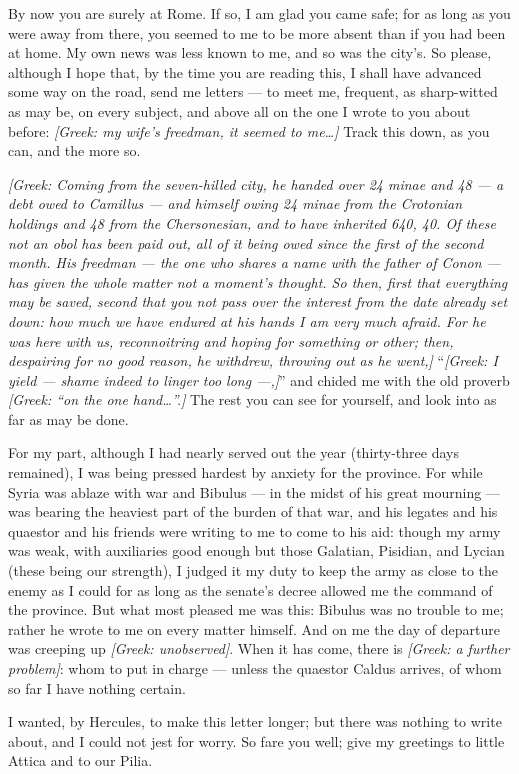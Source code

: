 

 By now you are surely at Rome. If so, I am glad you came safe; for as long as you were away from there, you seemed to me to be more absent than if you had been at home. My own news was less known to me, and so was the city's. So please, although I hope that, by the time you are reading this, I shall have advanced some way on the road, send me letters --- to meet me, frequent, as sharp-witted as may be, on every subject, and above all on the one I wrote to you about before: \textit{[Greek: my wife's freedman, it seemed to me\ldots]} Track this down, as you can, and the more so.

 \textit{[Greek: Coming from the seven-hilled city, he handed over 24 minae and 48 --- a debt owed to Camillus --- and himself owing 24 minae from the Crotonian holdings and 48 from the Chersonesian, and to have inherited 640, 40. Of these not an obol has been paid out, all of it being owed since the first of the second month. His freedman --- the one who shares a name with the father of Conon --- has given the whole matter not a moment's thought. So then, first that everything may be saved, second that you not pass over the interest from the date already set down: how much we have endured at his hands I am very much afraid. For he was here with us, reconnoitring and hoping for something or other; then, despairing for no good reason, he withdrew, throwing out as he went,]} ``\textit{[Greek: I yield --- shame indeed to linger too long ---,]}'' and chided me with the old proverb \textit{[Greek: ``on the one hand\ldots''.]} The rest you can see for yourself, and look into as far as may be done.

 For my part, although I had nearly served out the year (thirty-three days remained), I was being pressed hardest by anxiety for the province. For while Syria was ablaze with war and Bibulus --- in the midst of his great mourning --- was bearing the heaviest part of the burden of that war, and his legates and his quaestor and his friends were writing to me to come to his aid: though my army was weak, with auxiliaries good enough but those Galatian, Pisidian, and Lycian (these being our strength), I judged it my duty to keep the army as close to the enemy as I could for as long as the senate's decree allowed me the command of the province. But what most pleased me was this: Bibulus was no trouble to me; rather he wrote to me on every matter himself. And on me the day of departure was creeping up \textit{[Greek: unobserved]}. When it has come, there is \textit{[Greek: a further problem]}: whom to put in charge --- unless the quaestor Caldus arrives, of whom so far I have nothing certain.

 I wanted, by Hercules, to make this letter longer; but there was nothing to write about, and I could not jest for worry. So fare you well; give my greetings to little Attica and to our Pilia.
